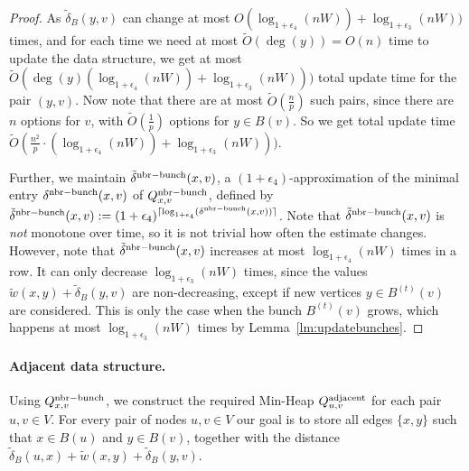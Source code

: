 \begin{proof}
    
    As $\tilde\delta_B(y,v)$ can change at most $O(\log_{1+\epsilon_4}(nW))+\log_{1+\epsilon_3}(nW))$ times, and for each time we need at most $\tilde O(\deg(y))=O(n)$ time to update the data structure, we get at most $\tilde O(\deg(y)(\log_{1+\epsilon_4}(nW))+\log_{1+\epsilon_3}(nW)))$ total update time for the pair $(y,v)$. Now note that there are at most $\tilde O(\tfrac{n}{p})$ such pairs, since there are $n$ options for $v$, with $\tilde O(\tfrac{1}{p})$ options for $y\in B(v)$. So we get total update time  $ \tilde O (\tfrac{n^2}{p} \cdot (\log_{1+\epsilon_4}(nW))+\log_{1+\epsilon_3}(nW))) $.
     
    Further, we maintain $\tilde\delta^{\rm{nbr-bunch}}(x,v)$, a $(1+\epsilon_4)$-approximation of the minimal entry $\delta^{\rm{nbr-bunch}}(x,v)$ of $Q^{\rm{nbr-bunch}}_{x,v}$, defined by $\tilde\delta^{\rm{nbr-bunch}}(x,v):= (1+\epsilon_4)^{\lceil\log_{1+\epsilon_4}(\delta^{\rm{nbr-bunch}}(x,v))\rceil}$. 
    Note that $\tilde\delta^{\rm{nbr-bunch}}(x,v)$ is \emph{not} monotone over time, so it is not trivial how often the estimate changes. However, note that $\tilde\delta^{\rm{nbr-bunch}}(x,v)$ increases at most $\log_{1+\epsilon_4}(nW)$ times in a row. It can only decrease $\log_{1+\epsilon_3}(nW)$ times, since the values $\tilde w(x,y)+\tilde\delta_B(y,v)$ are non-decreasing, except if new vertices $y\in B^{(t)}(v)$ are considered. This is only the case when the bunch $B^{(t)}(v)$ grows, which happens at most $\log_{1+\epsilon_3}(nW)$ times by Lemma~\ref{lm:updatebunches}.
\end{proof}


\paragraph{Adjacent data structure.}
Using $Q^{\rm{nbr-bunch}}_{x,v}$, we construct the required Min-Heap $Q^{\rm{adjacent}}_{u,v}$ for each pair $u,v\in V$. For every pair of nodes $ u, v \in V $ our goal is to store all edges $ \{x, y\} $ such that $ x \in B (u) $ and $ y \in B (v) $, together with the distance $\tilde\delta_B(u,x)+\tilde w(x,y)+\tilde\delta_B(y,v)$.


